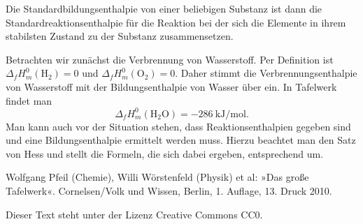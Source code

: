 \documentclass[a4paper,11pt,fleqn,twocolumn]{article}
\newcommand{\unit}[1]{\mathrm{#1}}
\begin{document}
Die Standardbildungsenthalpie von einer beliebigen Substanz
ist dann die Standardreaktionsenthalpie für die Reaktion bei der
sich die Elemente in ihrem stabilsten Zustand
zu der Substanz zusammensetzen.

Betrachten wir zunächst die Verbrennung von Wasserstoff.
Per Definition ist $\Delta_f H_m^0(\mathrm{H_2})=0$
und $\Delta_f H_m^0(\mathrm{O_2})=0$. Daher stimmt die
Verbrennungsenthalpie von Wasserstoff mit der Bildungsenthalpie
von Wasser über ein. In Tafelwerk \cite{Cornelsen} findet man
\[\Delta_f H_m^0 (\mathrm{H_2O}) = -286\:\unit{kJ/mol}.\]
Man kann auch vor der Situation stehen, dass Reaktionsenthalpien
gegeben sind und eine Bildungsenthalpie ermittelt werden muss.
Hierzu beachtet man den Satz von Hess und stellt die Formeln,
die sich dabei ergeben, entsprechend um.

\begin{thebibliography}{xx}
\setlength{\itemsep}{0pt}
 Wolfgang Pfeil (Chemie), Willi Wörstenfeld (Physik)
et al:
»Das große Tafelwerk«.
Cornelsen/Volk und Wissen, Berlin, 1. Auflage, 13. Druck 2010.
\end{thebibliography}

\vfill

\noindent
{\small Dieser Text steht unter der Lizenz Creative Commons CC0.}
\end{document}

